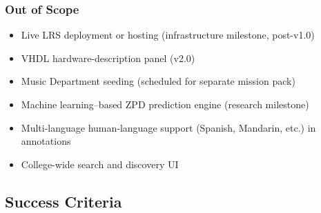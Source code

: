 \documentclass[11pt,letterpaper]{article}
\begin{document}
\subsubsection{Out of Scope}
\begin{itemize}[noitemsep]
  \item Live LRS deployment or hosting (infrastructure milestone, post-v1.0)
  \item VHDL hardware-description panel (v2.0)
  \item Music Department seeding (scheduled for separate mission pack)
  \item Machine learning--based ZPD prediction engine (research milestone)
  \item Multi-language human-language support (Spanish, Mandarin, etc.) in annotations
  \item College-wide search and discovery UI
\end{itemize}

\subsection{Success Criteria}
\end{document}
